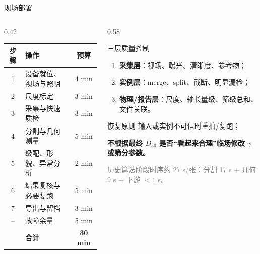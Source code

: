 \documentclass[UTF8,aspectratio=169,11pt]{ctexbeamer}
\newcommand{\smallgray}[1]{{\scriptsize\textcolor{gray}{#1}}}
\begin{document}
\begin{frame}{现场部署}
\begin{columns}[T]
\begin{column}{0.42\textwidth}
{\scriptsize
\renewcommand{\arraystretch}{1.13}
\begin{tabular}{clc}
\toprule
步骤 & 操作 & 预算 \\
\midrule
1 & 设备就位、视场与照明 & 4 min \\
2 & 尺度标定 & 3 min \\
3 & 采集与快速质检 & 3 min \\
4 & 分割与几何测量 & 5 min \\
5 & 级配、形貌、异常分析 & 2 min \\
6 & 结果复核与必要复跑 & 5 min \\
7 & 导出与留档 & 3 min \\
-- & 故障余量 & 5 min \\
\midrule
& \textbf{合计} & \textbf{30 min} \\
\bottomrule
\end{tabular}}
\end{column}
\begin{column}{0.58\textwidth}
\begin{block}{三层质量控制}
\footnotesize
\begin{enumerate}
  \item \textbf{采集层}：视场、曝光、清晰度、参考物；
  \item \textbf{实例层}：merge、split、截断、明显漏检；
  \item \textbf{物理/报告层}：尺度、轴长量级、筛级总和、文件关联。
\end{enumerate}
\end{block}
\begin{alertblock}{恢复原则}
\footnotesize 输入或实例不可信时重拍/复跑；

\textbf{不根据最终 $D_{50}$ 是否“看起来合理”临场修改 $\gamma$ 或筛分参数。}
\end{alertblock}
\smallgray{历史算法阶段时序约 27 s/张：分割 17 s + 几何 9 s + 下游 $<1$ s。}
\end{column}
\end{columns}
\end{frame}
\end{document}
